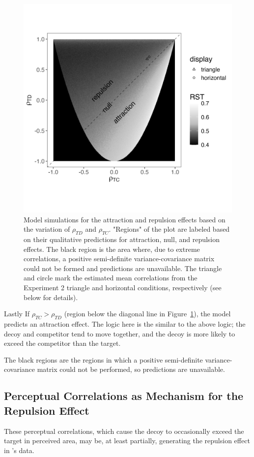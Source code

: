\begin{figure}
   \includegraphics[width=\linewidth]{figures/3d_sim_rst.jpg}
   \caption{Model simulations for the attraction and repulsion effects based on the variation of $\rho_{TD}$ and $\rho_{TC}$. "Regions" of the plot are labeled based on their qualitative predictions for attraction, null, and repulsion effects. The black region is the area where, due to extreme correlations, a positive semi-definite variance-covariance matrix could not be formed and predictions are unavailable. The triangle and circle mark the estimated mean correlations from the Experiment 2 triangle and horizontal conditions, respectively (see below for details).}
   \label{fig:3d_model}
\end{figure}

Lastly If $\rho_{TC}>\rho_{TD}$ (region below the diagonal line in Figure~\ref{fig:3d_model}), the model predicts an attraction effect. The logic here is the similar to the above logic; the decoy and competitor tend to move together, and the decoy is more likely to exceed the competitor than the target. 

The black regions are the regions in which a positive semi-definite variance-covariance matrix could not be performed, so predictions are unavailable.

\subsection{Perceptual Correlations as Mechanism for the Repulsion Effect}
These perceptual correlations, which cause the decoy to occasionally exceed the target in perceived area, may be, at least partially, generating the repulsion effect in \textcite{spektorWhenGoodLooks2018b}'s data. 

